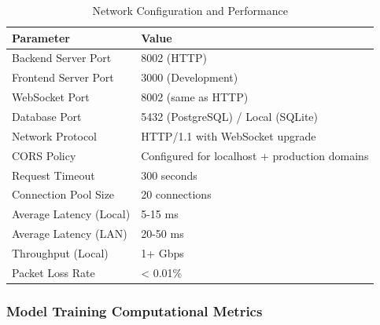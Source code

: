 \documentclass[12pt,a4paper]{article}
\begin{document}
\begin{table}[H]
\centering
\caption{Network Configuration and Performance}
\begin{tabular}{ll}
\toprule
\textbf{Parameter} & \textbf{Value} \\
\midrule
Backend Server Port & 8002 (HTTP) \\
Frontend Server Port & 3000 (Development) \\
WebSocket Port & 8002 (same as HTTP) \\
Database Port & 5432 (PostgreSQL) / Local (SQLite) \\
\midrule
Network Protocol & HTTP/1.1 with WebSocket upgrade \\
CORS Policy & Configured for localhost + production domains \\
Request Timeout & 300 seconds \\
Connection Pool Size & 20 connections \\
\midrule
Average Latency (Local) & 5-15 ms \\
Average Latency (LAN) & 20-50 ms \\
Throughput (Local) & 1+ Gbps \\
Packet Loss Rate & < 0.01\% \\
\bottomrule
\end{tabular}
\end{table}

\subsubsection{Model Training Computational Metrics}
\end{document}
